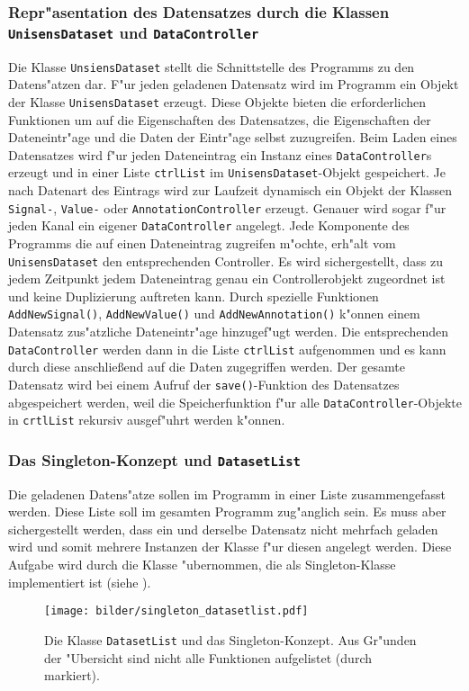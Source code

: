 \subsubsection{Repr"asentation des Datensatzes durch die Klassen \texttt{UnisensDataset} und \texttt{DataController}}
\label{sec:datensatz_repraesentation}

Die Klasse \verb|UnsiensDataset| stellt die Schnittstelle des Programms zu den Datens"atzen dar.
F"ur jeden geladenen Datensatz wird im Programm ein Objekt der Klasse \verb|UnisensDataset| erzeugt.
Diese Objekte bieten die erforderlichen Funktionen um auf die Eigenschaften des Datensatzes, die Eigenschaften der Dateneintr"age und die Daten der Eintr"age selbst zuzugreifen.
Beim Laden eines Datensatzes wird f"ur jeden Dateneintrag ein Instanz eines \verb|DataController|s erzeugt und in einer Liste \verb|ctrlList| im \verb|UnisensDataset|-Objekt gespeichert.
Je nach Datenart des Eintrags wird zur Laufzeit dynamisch ein Objekt der Klassen \verb|Signal-|, \verb|Value-| oder \verb|AnnotationController| erzeugt.
Genauer wird sogar f"ur jeden Kanal ein eigener \verb|DataController| angelegt.
Jede Komponente des Programms die auf einen Dateneintrag zugreifen m"ochte, erh"alt vom \verb|UnisensDataset| den entsprechenden Controller.
Es wird sichergestellt, dass zu jedem Zeitpunkt jedem Dateneintrag genau ein Controllerobjekt zugeordnet ist und keine Duplizierung auftreten kann.
Durch spezielle Funktionen \verb|AddNewSignal()|, \verb|AddNewValue()| und \verb|AddNewAnnotation()| k"onnen einem Datensatz zus"atzliche Dateneintr"age hinzugef"ugt werden.
Die entsprechenden \verb|DataController| werden dann in die Liste \verb|ctrlList| aufgenommen und es kann durch diese anschlie\ss end auf die Daten zugegriffen werden.
Der gesamte Datensatz wird bei einem Aufruf der \verb|save()|-Funktion des Datensatzes abgespeichert werden, weil die Speicherfunktion f"ur alle \verb|DataController|-Objekte in \verb|crtlList| rekursiv ausgef"uhrt werden k"onnen.

\subsubsection{Das Singleton-Konzept und \texttt{DatasetList}}

Die geladenen Datens"atze sollen im Programm in einer Liste zusammengefasst werden.
Diese Liste soll im gesamten Programm zug"anglich sein.
Es muss aber sichergestellt werden, dass ein und derselbe Datensatz nicht mehrfach geladen wird und somit mehrere Instanzen der Klasse  f"ur diesen angelegt werden.
Diese Aufgabe wird durch die Klasse  "ubernommen, die als Singleton-Klasse implementiert ist (siehe ).
\begin{figure}[htb]
\centering
\texttt{[image: bilder/singleton\_datasetlist.pdf]}
\caption[Klasse \texttt{DatasetList} und das Singleton-Konzept]{Die Klasse \texttt{DatasetList} und das Singleton-Konzept. Aus Gr"unden der "Ubersicht sind nicht alle Funktionen aufgelistet (durch  markiert).}
\label{pic:datasetlist}
\end{figure}

